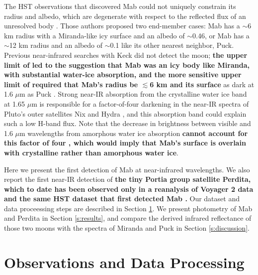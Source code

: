 \documentclass[preprint]{aastex631}
\begin{document}
The HST observations that discovered Mab could not uniquely constrain its radius and albedo, which are degenerate with respect to the reflected flux of an unresolved body \citep{showalter06}. Those authors proposed two end-member cases: Mab has a $\sim$6 km radius with a Miranda-like icy surface and an albedo of $\sim$0.46, or Mab has a $\sim$12 km radius and an albedo of $\sim$0.1 like its other nearest neighbor, Puck. Previous near-infrared searches with Keck did not detect the moon; \textbf{the upper limit of \citet{depater06} led to the suggestion that Mab was an icy body like Miranda, with substantial water-ice absorption, and the more sensitive upper limit of \citet{paradis19} required that Mab's radius be $\lesssim$6 km and its surface} as dark at 1.6 $\mu$m as Puck \citep[albedo $\lesssim$0.11;][]{paradis23}. Strong near-IR absorption from the crystalline water ice band at 1.65 $\mu$m is responsible for a factor-of-four darkening in the near-IR spectra of Pluto's outer satellites Nix and Hydra \citep{cook18}, and this absorption band could explain such a low H-band flux. Note that the decrease in brightness between visible and 1.6 $\mu$m wavelengths from amorphous water ice absorption \textbf{cannot account for this factor of four \citep[][]{mastrapa08, terai16}, which would imply that Mab's surface is overlain with crystalline rather than amorphous water ice}.

Here we present the first detection of Mab at near-infrared wavelengths. We also report the first near-IR detection of \textbf{the tiny Portia group satellite Perdita, which to date has been observed only in a reanalysis of Voyager 2 data \citep{karkoschka01b} and the same HST dataset that first detected Mab \citep{showalter06}.} Our dataset and data proceessing steps are described in Section \ref{s:observations}. We present photometry of Mab and Perdita in Section \ref{s:results}, and compare the derived infrared reflectance of those two moons with the spectra of Miranda and Puck in Section \ref{s:discussion}.

\section{Observations and Data Processing}
\label{s:observations}
\end{document}

